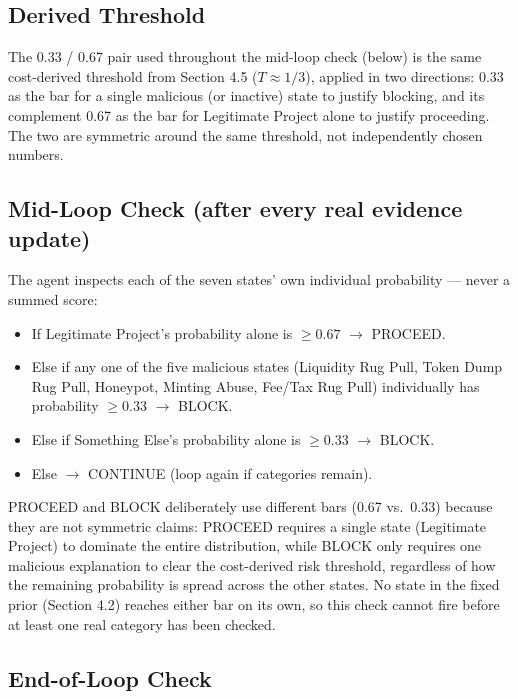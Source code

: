 \documentclass[11pt]{article}
\begin{document}
\subsection{Derived Threshold}

The 0.33 / 0.67 pair used throughout the mid-loop check (below) is the same cost-derived threshold from Section 4.5 ($T\approx1/3$), applied in two directions: 0.33 as the bar for a single malicious (or inactive) state to justify blocking, and its complement 0.67 as the bar for Legitimate Project alone to justify proceeding. The two are symmetric around the same threshold, not independently chosen numbers.

\subsection{Mid-Loop Check (after every real evidence update)}

The agent inspects each of the seven states' own individual probability --- never a summed score:

\begin{itemize}[leftmargin=*]
    \item If Legitimate Project's probability alone is $\geq 0.67$ $\rightarrow$ PROCEED.
    \item Else if any one of the five malicious states (Liquidity Rug Pull, Token Dump Rug Pull, Honeypot, Minting Abuse, Fee/Tax Rug Pull) individually has probability $\geq 0.33$ $\rightarrow$ BLOCK.
    \item Else if Something Else's probability alone is $\geq 0.33$ $\rightarrow$ BLOCK.
    \item Else $\rightarrow$ CONTINUE (loop again if categories remain).
\end{itemize}

PROCEED and BLOCK deliberately use different bars (0.67 vs.\ 0.33) because they are not symmetric claims: PROCEED requires a single state (Legitimate Project) to dominate the entire distribution, while BLOCK only requires one malicious explanation to clear the cost-derived risk threshold, regardless of how the remaining probability is spread across the other states. No state in the fixed prior (Section 4.2) reaches either bar on its own, so this check cannot fire before at least one real category has been checked.

\subsection{End-of-Loop Check}
\end{document}
